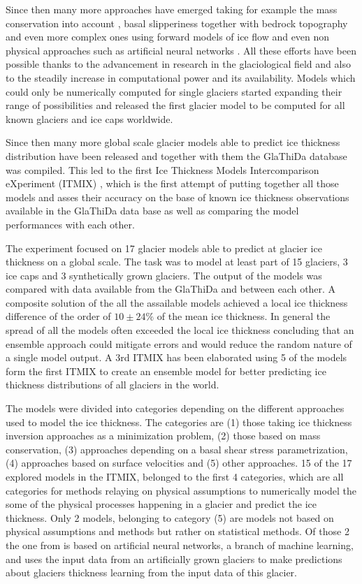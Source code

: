 Since then many more approaches have emerged taking for example the mass conservation into account \cite{rasmussen_1988}, basal slipperiness together with bedrock topography \cite{Gudmundsson2001} and even more complex ones using forward models of ice flow \cite{vanPelt2013} and even non physical approaches such as artificial neural networks \cite{Clarke2009}. All these efforts have been possible thanks to the advancement in research in the glaciological field and also to the steadily increase in computational power and its availability. Models which could only be numerically computed for single glaciers started expanding their range of possibilities and \citet{Huss2012} released the first glacier model to be computed for all known glaciers and ice caps worldwide.

Since then many more global scale glacier models able to predict ice thickness distribution have been released and together with them the GlaThiDa database was compiled. This led to the first Ice Thickness Models Intercomparison eXperiment (ITMIX) \cite{Farinotti2017}, which is the first attempt of putting together all those models and asses their accuracy on the base of known ice thickness observations available in the GlaThiDa data base as well as comparing the model performances with each other. 

The experiment focused on 17 glacier models able to predict at glacier ice thickness on a global scale. The task was to model at least part of 15 glaciers, 3 ice caps and 3 synthetically grown glaciers. The output of the models was compared with data available from the GlaThiDa and between each other. A composite solution of the all the assailable models achieved a local ice thickness difference of the order of $10 \pm 24\%$ of the mean ice thickness. In general the spread of all the  models often exceeded the local ice thickness concluding that an ensemble approach could mitigate errors and would reduce the random nature of a single model output. A 3rd ITMIX \cite{Farinotti2019} has been elaborated using 5 of the models form the first ITMIX to create an ensemble model for better predicting ice thickness distributions of all glaciers in the world.  

The models were divided into categories depending on the different approaches used to model the ice thickness. The categories are (1) those taking ice thickness inversion approaches as a minimization problem, (2) those based on mass conservation,  (3) approaches depending on a basal shear stress parametrization, (4) approaches based on surface velocities and (5) other approaches. 15 of the 17 explored models in the ITMIX, belonged to the first 4 categories, which are all categories for methods relaying on physical assumptions to numerically model the some of the physical processes happening in a glacier and predict the ice thickness. Only 2 models, belonging to category (5) are models not based on physical assumptions and methods but rather on statistical methods. Of those 2 the one from \citet{Clarke2009} is based on artificial neural networks, a branch of machine learning, and uses the input data from an artificially grown glaciers to make predictions about glaciers thickness learning from the input data of this glacier.

